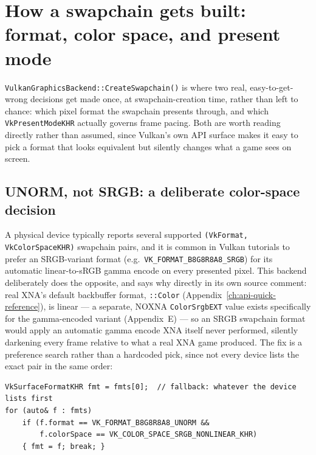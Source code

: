 \section{How a swapchain gets built: format, color space, and present mode}
\label{sec:vulkan-swapchain}

\texttt{VulkanGraphicsBackend::CreateSwapchain()} is where two real, easy-to-get-wrong
decisions get made once, at swapchain-creation time, rather than left to chance: which pixel
format the swapchain presents through, and which \texttt{VkPresentModeKHR} actually governs
frame pacing. Both are worth reading directly rather than assumed, since Vulkan's own API
surface makes it easy to pick a format that looks equivalent but silently changes what a game
sees on screen.

\subsection{UNORM, not SRGB: a deliberate color-space decision}

A physical device typically reports several supported \texttt{(VkFormat, VkColorSpaceKHR)}
swapchain pairs, and it is common in Vulkan tutorials to prefer an SRGB-variant format (e.g.\
\texttt{VK\_FORMAT\_B8G8R8A8\_SRGB}) for its automatic linear-to-sRGB gamma encode on every
presented pixel. This backend deliberately does the opposite, and says why directly in its own
source comment: real XNA's default backbuffer format, \cnans{SurfaceFormat}\texttt{::Color}
(Appendix~\ref{ch:api-quick-reference}), is linear --- a separate,
NOXNA\allowbreak{} \texttt{ColorSrgbEXT} value exists specifically for the gamma-encoded
variant (Appendix~E) --- so an SRGB swapchain format would apply an automatic gamma encode XNA
itself never performed, silently darkening every frame relative to what a real XNA game
produced. The fix is a preference search rather than a hardcoded pick, since not every device
lists the exact pair in the same order:

\begin{lstlisting}
VkSurfaceFormatKHR fmt = fmts[0];  // fallback: whatever the device lists first
for (auto& f : fmts)
    if (f.format == VK_FORMAT_B8G8R8A8_UNORM &&
        f.colorSpace == VK_COLOR_SPACE_SRGB_NONLINEAR_KHR)
    { fmt = f; break; }
\end{lstlisting}

